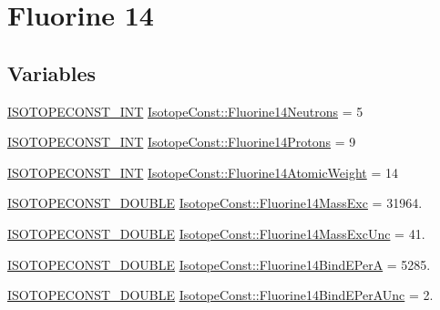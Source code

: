 \hypertarget{group___isotope_const-_fluorine-_f14}{}\section{Fluorine 14}
\label{group___isotope_const-_fluorine-_f14}
\subsection*{Variables}
\begin{DoxyCompactItemize}
\item 
\mbox{\hyperlink{group___isotope_const-_macros_ga5f18360b3e99483a35c32d789e62621c}{I\+S\+O\+T\+O\+P\+E\+C\+O\+N\+S\+T\+\_\+\+I\+NT}} \mbox{\hyperlink{group___isotope_const-_fluorine-_f14_ga8ca1ac7c2ecf44a219c393490b6cd1d0}{Isotope\+Const\+::\+Fluorine14\+Neutrons}} = 5
\item 
\mbox{\hyperlink{group___isotope_const-_macros_ga5f18360b3e99483a35c32d789e62621c}{I\+S\+O\+T\+O\+P\+E\+C\+O\+N\+S\+T\+\_\+\+I\+NT}} \mbox{\hyperlink{group___isotope_const-_fluorine-_f14_gae9206a380ec5faae7c495ca36b63ba54}{Isotope\+Const\+::\+Fluorine14\+Protons}} = 9
\item 
\mbox{\hyperlink{group___isotope_const-_macros_ga5f18360b3e99483a35c32d789e62621c}{I\+S\+O\+T\+O\+P\+E\+C\+O\+N\+S\+T\+\_\+\+I\+NT}} \mbox{\hyperlink{group___isotope_const-_fluorine-_f14_ga29b05f9dc0452374e4aa6869b324c934}{Isotope\+Const\+::\+Fluorine14\+Atomic\+Weight}} = 14
\item 
\mbox{\hyperlink{group___isotope_const-_macros_ga8f45a7272ce02c0b4c65c44636ed719a}{I\+S\+O\+T\+O\+P\+E\+C\+O\+N\+S\+T\+\_\+\+D\+O\+U\+B\+LE}} \mbox{\hyperlink{group___isotope_const-_fluorine-_f14_gafd85fd4081362929e3cdc02a0ba9af89}{Isotope\+Const\+::\+Fluorine14\+Mass\+Exc}} = 31964.
\item 
\mbox{\hyperlink{group___isotope_const-_macros_ga8f45a7272ce02c0b4c65c44636ed719a}{I\+S\+O\+T\+O\+P\+E\+C\+O\+N\+S\+T\+\_\+\+D\+O\+U\+B\+LE}} \mbox{\hyperlink{group___isotope_const-_fluorine-_f14_ga6ea15874c971b763a439c10c25819f3d}{Isotope\+Const\+::\+Fluorine14\+Mass\+Exc\+Unc}} = 41.
\item 
\mbox{\hyperlink{group___isotope_const-_macros_ga8f45a7272ce02c0b4c65c44636ed719a}{I\+S\+O\+T\+O\+P\+E\+C\+O\+N\+S\+T\+\_\+\+D\+O\+U\+B\+LE}} \mbox{\hyperlink{group___isotope_const-_fluorine-_f14_ga85106ffdc830ad9b472d22a14be8dcf5}{Isotope\+Const\+::\+Fluorine14\+Bind\+E\+PerA}} = 5285.
\item 
\mbox{\hyperlink{group___isotope_const-_macros_ga8f45a7272ce02c0b4c65c44636ed719a}{I\+S\+O\+T\+O\+P\+E\+C\+O\+N\+S\+T\+\_\+\+D\+O\+U\+B\+LE}} \mbox{\hyperlink{group___isotope_const-_fluorine-_f14_ga1d09368987e6c9c4654663340511c3a3}{Isotope\+Const\+::\+Fluorine14\+Bind\+E\+Per\+A\+Unc}} = 2.

\end{DoxyCompactItemize}
